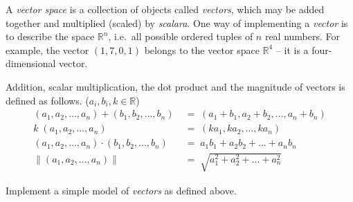 

\problem A \textit{vector space} is a collection of objects called \textit{vectors}, which may be added together and
multiplied (scaled) by \textit{scalara}. One way of implementing a \textit{vector} is to describe the space $\mathbb{R}^n$,
i.e.\ all possible ordered tuples of $n$ real numbers. For example, the vector $(1, 7, 0, 1)$ belongs to the vector space
$\mathbb{R}^4$ -- it is a four-dimensional vector.

Addition, scalar multiplication, the dot product and the magnitude of vectors is defined as follows. ($a_i, b_i, k \in \mathbb{R}$)
\begin{align*}
	(a_1, a_2, \dots, a_n) + (b_1, b_2, \dots, b_n) \;&=\; (a_1+b_1, a_2+b_2, \dots, a_n + b_n)  \tag{Addition} \\
	k \;(a_1, a_2, \dots, a_n) \;&=\; (ka_1, ka_2, \dots, ka_n)		\tag{Scalar Multiplication} \\
	(a_1, a_2, \dots, a_n) \cdot (b_1, b_2, \dots, b_n) \;&=\; a_1b_1 + a_2b_2 + \dots + a_nb_n  \tag{Dot Product} \\
	\left\| (a_1, a_2, \dots, a_n) \right\| \;&=\; \sqrt{a_1^2 + a_2^2 + \dots + a_n^2}	\tag{Magnitude}
\end{align*}

Implement a simple model of \textit{vectors} as defined above. 

